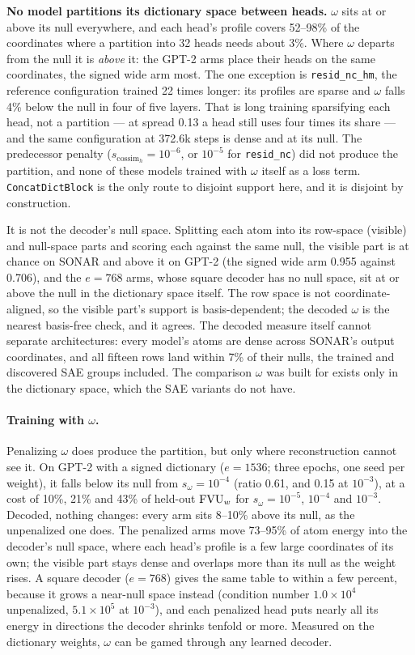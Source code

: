 \textbf{No model partitions its dictionary space between heads.} $\omega$
sits at or above its null everywhere, and each head's profile covers 52--98\%
of the coordinates where a partition into 32 heads needs about 3\%. Where
$\omega$ departs from the null it is \emph{above} it: the GPT-2 arms place
their heads on the same coordinates, the signed wide arm most. The one
exception is \texttt{resid\_nc\_hm}, the reference configuration trained 22
times longer: its profiles are sparse and $\omega$ falls 4\% below the null
in four of five layers. That is long training sparsifying each head, not a
partition --- at spread 0.13 a head still uses four times its share --- and
the same configuration at 372.6k steps is dense and at its null. The
predecessor penalty ($s_{\mathrm{cossim}_h}{=}10^{-6}$, or $10^{-5}$ for
\texttt{resid\_nc}) did not produce the partition, and none of these
models trained with $\omega$ itself as a loss term.
\texttt{ConcatDictBlock} is the only route to disjoint support here, and
it is disjoint by construction.

It is not the decoder's null space. Splitting each atom into its row-space
(visible) and null-space parts and scoring each against the same null, the
visible part is at chance on SONAR and above it on GPT-2 (the signed wide
arm 0.955 against 0.706), and the $e{=}768$ arms, whose square decoder has
no null space, sit at or above the null in the dictionary space itself.
The row space is not coordinate-aligned, so the visible part's support is
basis-dependent; the decoded $\omega$ is the nearest basis-free check, and
it agrees. The decoded measure itself cannot separate architectures: every
model's atoms are dense across SONAR's output coordinates, and all fifteen
rows land within 7\% of their nulls, the trained and discovered SAE groups
included. The comparison $\omega$ was built for exists only in the
dictionary space, which the SAE variants do not have.

\paragraph{Training with $\omega$.} Penalizing $\omega$ does produce the
partition, but only where reconstruction cannot see it. On GPT-2 with a
signed dictionary ($e{=}1536$; three epochs, one seed per weight), it
falls below its null from $s_\omega{=}10^{-4}$ (ratio 0.61, and 0.15 at
$10^{-3}$), at a cost of 10\%, 21\% and 43\% of held-out $\mathrm{FVU}_w$ for
$s_\omega{=}10^{-5}$, $10^{-4}$ and $10^{-3}$. Decoded, nothing changes:
every arm sits 8--10\% above its null, as the unpenalized one does. The
penalized arms move 73--95\% of atom energy into the decoder's null
space, where each head's profile is a few large coordinates of its own;
the visible part stays dense and overlaps more than its null as the
weight rises. A square decoder ($e{=}768$) gives the same table to within
a few percent, because it grows a near-null space instead (condition
number $1.0\times10^4$ unpenalized, $5.1\times10^5$ at $10^{-3}$), and
each penalized head puts nearly all its energy in directions the decoder
shrinks tenfold or more. Measured on the dictionary weights, $\omega$ can
be gamed through any learned decoder.


